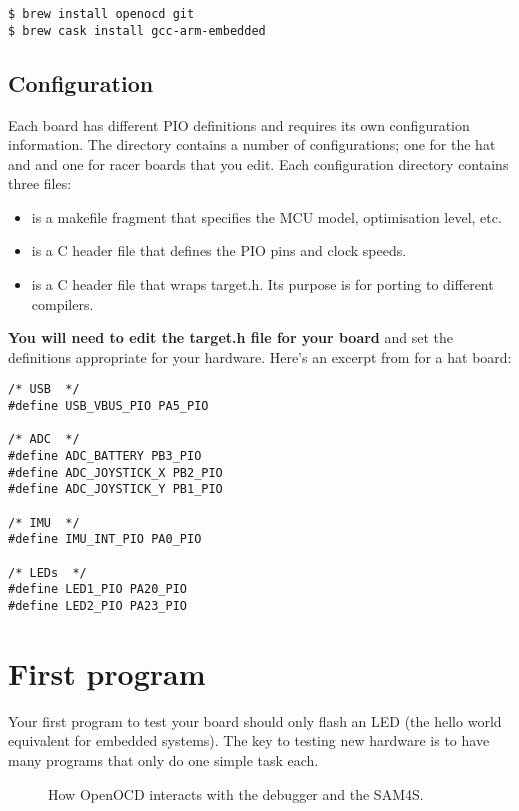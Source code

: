 \begin{verbatim}
$ brew install openocd git
$ brew cask install gcc-arm-embedded
\end{verbatim}


\subsection{Configuration}
\label{configuration}

Each board has different PIO definitions and requires its own
configuration information. The  directory contains a
number of configurations; one for the hat and and one for racer boards
that you edit.  Each configuration directory contains three files:

\begin{itemize}
\item
   is a makefile fragment that specifies the MCU model,
  optimisation level, etc.
\item
   is a C header file that defines the PIO pins and
  clock speeds.
\item
   is a C header file that wraps target.h. Its purpose
  is for porting to different compilers.
\end{itemize}

\textbf{You will need to edit the target.h file for your board} and set
the definitions appropriate for your hardware. Here's an excerpt from
 for a hat board:

\begin{verbatim}
/* USB  */
#define USB_VBUS_PIO PA5_PIO

/* ADC  */
#define ADC_BATTERY PB3_PIO
#define ADC_JOYSTICK_X PB2_PIO
#define ADC_JOYSTICK_Y PB1_PIO

/* IMU  */
#define IMU_INT_PIO PA0_PIO

/* LEDs  */
#define LED1_PIO PA20_PIO
#define LED2_PIO PA23_PIO
\end{verbatim}

\section{First program}
\label{first-program}

Your first program to test your board should only flash an LED (the
hello world equivalent for embedded systems). The key to testing new
hardware is to have many programs that only do one simple task each.

\begin{figure}

\caption{How OpenOCD interacts with the debugger and the SAM4S.}
\label{fig:openocd diagram}
\end{figure}


